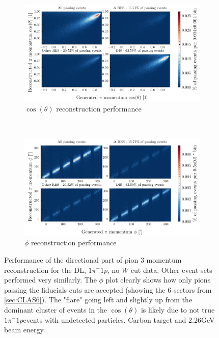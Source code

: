 \documentclass[a4paper,12pt]{article}
\newcommand{\md}{$1\pi^-1p$}
\begin{document}
\begin{appendices}
    \begin{figure}[H]
        \centering
        \begin{subfigure}{\textwidth}
            \centering
            \includegraphics{figures/python/vs_ct_C_m_dl.pdf}
            \caption{$\cos(\theta)$ reconstruction performance}
        \end{subfigure}
        \\
        \begin{subfigure}{\textwidth}
            \centering
            \includegraphics{figures/python/vs_phi_C_m_dl.pdf}
            \caption{$\phi$ reconstruction performance}
        \end{subfigure}
        \caption{
            Performance of the directional part of pion 3 momentum reconstruction for the DL, \md, no $W$ cut data.
            Other event sets performed very similarly.
            The $\phi$ plot clearly shows how only pions passing the fiducials cuts are accepted (showing the 6 sectors from \cref{sec:CLAS6}).
            The "flare" going left and slightly up from the dominant cluster of events in the $\cos(\theta)$ is likely due to not true \md events with undetected particles.
            Carbon target and 2.26\si{GeV} beam energy.
        }\label{fig:vs_dir_dl}
    \end{figure}


\end{appendices}
\end{document}
